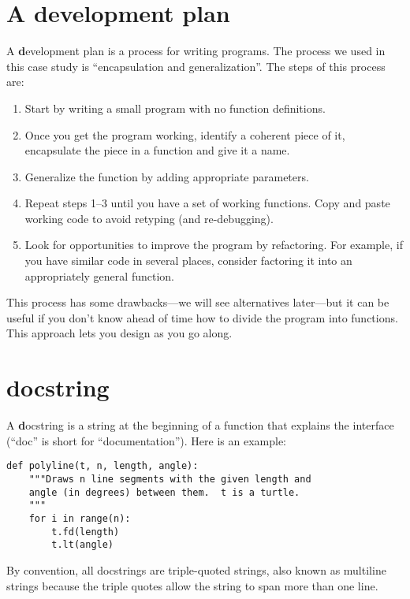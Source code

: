 \documentclass[
DIV=11,
fontsize=13,
twoside,
headinclude=false,
titlepage=firstiscover,
abstract=true,
headsepline=true,
footsepline=true,
chapterprefix=true, %
headings=big,
bibliography=totoc,%
captions=tableheading
]{scrbook}
\theoremstyle{definition}
\begin{document}
\section{A development plan}

A {\textbf development plan} is a process for writing programs.  The
process we used in this case study is ``encapsulation and
generalization''.  The steps of this process are:

\begin{enumerate}

\item Start by writing a small program with no function definitions.

\item Once you get the program working, identify a coherent piece of
  it, encapsulate the piece in a function and give it a name.

\item Generalize the function by adding appropriate parameters.

\item Repeat steps 1--3 until you have a set of working functions.
Copy and paste working code to avoid retyping (and re-debugging).

\item Look for opportunities to improve the program by refactoring.
For example, if you have similar code in several places, consider
factoring it into an appropriately general function.

\end{enumerate}

This process has some drawbacks---we will see alternatives later---but
it can be useful if you don't know ahead of time how to divide the
program into functions.  This approach lets you design as you go
along.


\section{docstring}
\label{docstring}

A {\textbf docstring} is a string at the beginning of a function that
explains the interface (``doc'' is short for ``documentation'').  Here
is an example:

\begin{lstlisting}
def polyline(t, n, length, angle):
    """Draws n line segments with the given length and
    angle (in degrees) between them.  t is a turtle.
    """    
    for i in range(n):
        t.fd(length)
        t.lt(angle)
\end{lstlisting}
%
By convention, all docstrings are triple-quoted strings, also known
as multiline strings because the triple quotes allow the string
to span more than one line.
\end{document}
